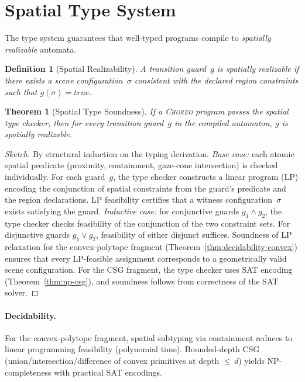 \documentclass[11pt,a4paper]{article}
\newtheorem{theorem}{Theorem}
\newtheorem{definition}{Definition}
\begin{document}
\section{Spatial Type System}\label{sec:types}

The type system guarantees that well-typed programs compile to
\emph{spatially realizable} automata.

\begin{definition}[Spatial Realizability]
A transition guard~$g$ is \emph{spatially realizable} if there exists a scene
configuration~$\sigma$ consistent with the declared region constraints such that
$g(\sigma) = \mathit{true}$.
\end{definition}

\begin{theorem}[Spatial Type Soundness]\label{thm:type-sound}
If a \textsc{Choreo} program passes the spatial type checker, then for every
transition guard~$g$ in the compiled automaton, $g$ is spatially realizable.
\end{theorem}

\begin{proof}[Sketch]
By structural induction on the typing derivation.
\emph{Base case:} each atomic spatial predicate (proximity, containment,
gaze-cone intersection) is checked individually.
For each guard~$g$, the type checker constructs a linear program (LP) encoding
the conjunction of spatial constraints from the guard's predicate and the region
declarations.
LP feasibility certifies that a witness configuration~$\sigma$ exists satisfying
the guard.
\emph{Inductive case:} for conjunctive guards $g_1 \wedge g_2$, the type checker
checks feasibility of the conjunction of the two constraint sets.
For disjunctive guards $g_1 \vee g_2$, feasibility of either disjunct suffices.
Soundness of LP relaxation for the convex-polytope fragment (Theorem~\ref{thm:decidability-convex})
ensures that every LP-feasible assignment corresponds to a geometrically valid
scene configuration.
For the CSG fragment, the type checker uses SAT encoding
(Theorem~\ref{thm:np-csg}), and soundness follows from correctness of the
SAT solver.
\end{proof}

\paragraph{Decidability.}
For the convex-polytope fragment, spatial subtyping via containment reduces to
linear programming feasibility (polynomial time).
Bounded-depth CSG (union/intersection/difference of convex primitives at depth
${\le}\,d$) yields NP-completeness with practical SAT encodings.
\end{document}
